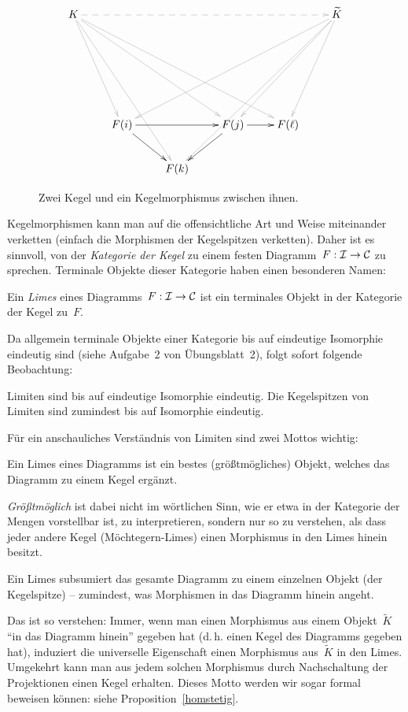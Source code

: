 \begin{figure}
  \[
    \xymatrix{
      K \ar@[grey]@{-->}[rrrrr]
      \ar@[grey][dddr] \ar@[grey][dddrrr] \ar@[grey][dddrrrr] \ar@[grey][ddddrr] &&&&&
      \widetilde K \ar@[grey][dddl] \ar@[grey][dddll] \ar@[grey][dddllll]
      \ar@[grey][ddddlll]
      \\\\\\
      & F(i) \ar[rr] \ar[rd] && F(j) \ar[r] \ar[ld] & F(\ell) \\
      & & F(k)
    }
  \]
  \caption{\label{kegel}Zwei Kegel und ein Kegelmorphismus zwischen ihnen.}
\end{figure}

Kegelmorphismen kann man auf die offensichtliche Art und Weise miteinander
verketten (einfach die Morphismen der Kegelspitzen verketten). Daher ist es
sinnvoll, von der \emph{Kategorie der Kegel} zu einem festen
Diagramm~$F:\mathcal{I}\to\mathcal{C}$ zu sprechen. Terminale Objekte dieser Kategorie haben
einen besonderen Namen:
\begin{defn}Ein \emph{Limes} eines Diagramms~$F:\mathcal{I}\to\mathcal{C}$ ist ein terminales
Objekt in der Kategorie der Kegel zu~$F$.\end{defn}
Da allgemein terminale Objekte einer Kategorie bis auf eindeutige Isomorphie
eindeutig sind (siehe Aufgabe~2 von Übungsblatt~2), folgt sofort folgende
Beobachtung:
\begin{prop}Limiten sind bis auf eindeutige Isomorphie eindeutig. Die
Kegelspitzen von Limiten sind zumindest bis auf Isomorphie eindeutig.\end{prop}

Für ein anschauliches Verständnis von Limiten sind zwei Mottos wichtig:
\begin{motto}Ein Limes eines Diagramms ist ein bestes
(größtmögliches) Objekt, welches das Diagramm zu einem Kegel ergänzt.
\end{motto}
\emph{Größtmöglich} ist dabei nicht im wörtlichen Sinn, wie er etwa in der Kategorie
der Mengen vorstellbar ist, zu interpretieren, sondern nur so zu verstehen,
als dass jeder andere Kegel
(Möchtegern-Limes) einen Morphismus in den Limes hinein besitzt.

\begin{motto}\label{limessubsumiert}
Ein Limes subsumiert das gesamte Diagramm zu einem einzelnen Objekt (der
Kegelspitze) -- zumindest, was Morphismen in das Diagramm hinein
angeht.\end{motto}
Das ist so verstehen: Immer, wenn man einen Morphismus aus einem
Objekt~$\widetilde K$ "`in das Diagramm hinein"' gegeben hat (d.\,h. einen Kegel des Diagramms
gegeben hat), induziert die universelle Eigenschaft einen Morphismus
aus~$\widetilde K$ in den Limes. Umgekehrt kann man aus jedem solchen
Morphismus durch Nachschaltung der Projektionen einen Kegel erhalten.
Dieses Motto werden wir sogar formal beweisen können: siehe
Proposition~\ref{homstetig}.


